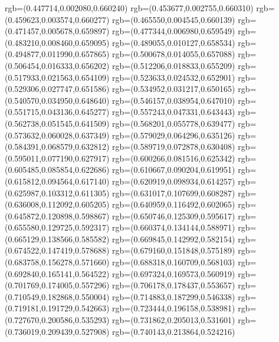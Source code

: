 {{{            rgb=(0.447714,0.002080,0.660240)
            rgb=(0.453677,0.002755,0.660310)
            rgb=(0.459623,0.003574,0.660277)
            rgb=(0.465550,0.004545,0.660139)
            rgb=(0.471457,0.005678,0.659897)
            rgb=(0.477344,0.006980,0.659549)
            rgb=(0.483210,0.008460,0.659095)
            rgb=(0.489055,0.010127,0.658534)
            rgb=(0.494877,0.011990,0.657865)
            rgb=(0.500678,0.014055,0.657088)
            rgb=(0.506454,0.016333,0.656202)
            rgb=(0.512206,0.018833,0.655209)
            rgb=(0.517933,0.021563,0.654109)
            rgb=(0.523633,0.024532,0.652901)
            rgb=(0.529306,0.027747,0.651586)
            rgb=(0.534952,0.031217,0.650165)
            rgb=(0.540570,0.034950,0.648640)
            rgb=(0.546157,0.038954,0.647010)
            rgb=(0.551715,0.043136,0.645277)
            rgb=(0.557243,0.047331,0.643443)
            rgb=(0.562738,0.051545,0.641509)
            rgb=(0.568201,0.055778,0.639477)
            rgb=(0.573632,0.060028,0.637349)
            rgb=(0.579029,0.064296,0.635126)
            rgb=(0.584391,0.068579,0.632812)
            rgb=(0.589719,0.072878,0.630408)
            rgb=(0.595011,0.077190,0.627917)
            rgb=(0.600266,0.081516,0.625342)
            rgb=(0.605485,0.085854,0.622686)
            rgb=(0.610667,0.090204,0.619951)
            rgb=(0.615812,0.094564,0.617140)
            rgb=(0.620919,0.098934,0.614257)
            rgb=(0.625987,0.103312,0.611305)
            rgb=(0.631017,0.107699,0.608287)
            rgb=(0.636008,0.112092,0.605205)
            rgb=(0.640959,0.116492,0.602065)
            rgb=(0.645872,0.120898,0.598867)
            rgb=(0.650746,0.125309,0.595617)
            rgb=(0.655580,0.129725,0.592317)
            rgb=(0.660374,0.134144,0.588971)
            rgb=(0.665129,0.138566,0.585582)
            rgb=(0.669845,0.142992,0.582154)
            rgb=(0.674522,0.147419,0.578688)
            rgb=(0.679160,0.151848,0.575189)
            rgb=(0.683758,0.156278,0.571660)
            rgb=(0.688318,0.160709,0.568103)
            rgb=(0.692840,0.165141,0.564522)
            rgb=(0.697324,0.169573,0.560919)
            rgb=(0.701769,0.174005,0.557296)
            rgb=(0.706178,0.178437,0.553657)
            rgb=(0.710549,0.182868,0.550004)
            rgb=(0.714883,0.187299,0.546338)
            rgb=(0.719181,0.191729,0.542663)
            rgb=(0.723444,0.196158,0.538981)
            rgb=(0.727670,0.200586,0.535293)
            rgb=(0.731862,0.205013,0.531601)
            rgb=(0.736019,0.209439,0.527908)
            rgb=(0.740143,0.213864,0.524216)
}}}
